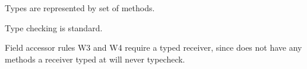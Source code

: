 \documentclass[a4paper,UKenglish,final]{lipics}
\begin{document}
Types are represented by set of methods. 

\hrulefill

\begin{mathpar}






\end{mathpar}


Type checking is standard.

Field accessor rules W3 and W4 require a typed receiver, since \any does
not have any methods a receiver typed at \any will never typecheck.

\hrulefill
\end{document}

